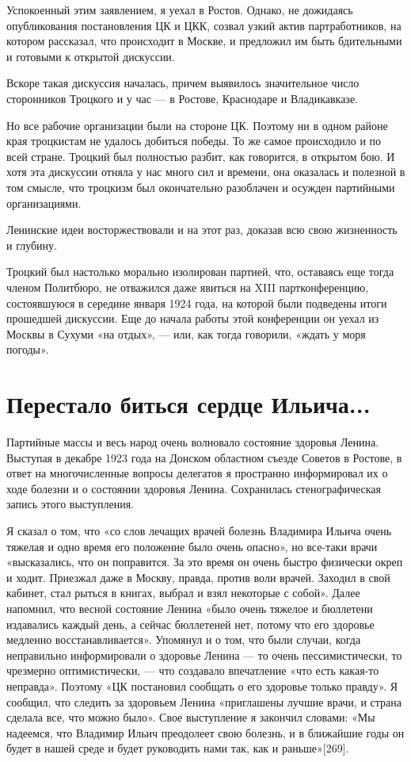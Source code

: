 \documentclass[12pt, a4paper, openany]{book}
\begin{document}
Успокоенный этим заявлением, я уехал в Ростов. Однако, не дожидаясь опубликования постановления ЦК и ЦКК, созвал узкий актив партработников, на котором рассказал, что происходит в Москве, и предложил им быть бдительными и готовыми к открытой дискуссии.

Вскоре такая дискуссия началась, причем выявилось значительное число сторонников Троцкого и у час — в Ростове, Краснодаре и Владикавказе.

Но все рабочие организации были на стороне ЦК. Поэтому ни в одном районе края троцкистам не удалось добиться победы. То же самое происходило и по всей стране. Троцкий был полностью разбит, как говорится, в открытом бою. И хотя эта дискуссии отняла у нас много сил и времени, она оказалась и полезной в том смысле, что троцкизм был окончательно разоблачен и осужден партийными организациями.

Ленинские идеи восторжествовали и на этот раз, доказав всю свою жизненность и глубину.

Троцкий был настолько морально изолирован партией, что, оставаясь еще тогда членом Политбюро, не отважился даже явиться на XIII партконференцию, состоявшуюся в середине января 1924 года, на которой были подведены итоги прошедшей дискуссии. Еще до начала работы этой конференции он уехал из Москвы в Сухуми «на отдых», — или, как тогда говорили, «ждать у моря погоды».

\newpage
\section[Перестало биться сердце Ильича...]{\center \textbf{Перестало биться сердце Ильича...}}


Партийные массы и весь народ очень волновало состояние здоровья Ленина. Выступая в декабре 1923 года на Донском областном съезде Советов в Ростове, в ответ на многочисленные вопросы делегатов я пространно информировал их о ходе болезни и о состоянии здоровья Ленина. Сохранилась стенографическая запись этого выступления.

Я сказал о том, что «со слов лечащих врачей болезнь Владимира Ильича очень тяжелая и одно время его положение было очень опасно», но все-таки врачи «высказались, что он поправится. За это время он очень быстро физически окреп и ходит. Приезжал даже в Москву, правда, против воли врачей. Заходил в свой кабинет, стал рыться в книгах, выбрал и взял некоторые с собой». Далее напомнил, что весной состояние Ленина «было очень тяжелое и бюллетени издавались каждый день, а сейчас бюллетеней нет, потому что его здоровье медленно восстанавливается». Упомянул и о том, что были случаи, когда неправильно информировали о здоровье Ленина — то очень пессимистически, то чрезмерно оптимистически, — что создавало впечатление «что есть какая-то неправда». Поэтому «ЦК постановил сообщать о его здоровье только правду». Я сообщил, что следить за здоровьем Ленина «приглашены лучшие врачи, и страна сделала все, что можно было». Свое выступление я закончил словами: «Мы надеемся, что Владимир Ильич преодолеет свою болезнь, и в ближайшие годы он будет в нашей среде и будет руководить нами так, как и раньше»[269].
\end{document}
